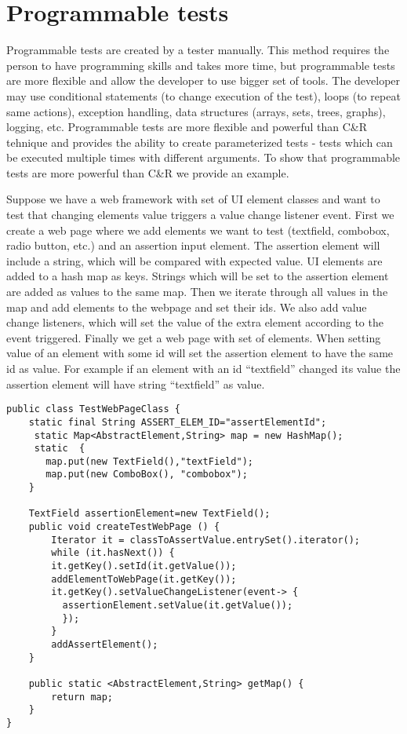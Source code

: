 		\section{Programmable tests} 
			Programmable tests are created by a tester manually. This method requires the
			person to have programming skills and takes more time, but programmable tests
			are more flexible and allow the developer to use bigger set of tools. The
			developer may use conditional statements (to change execution of the test),
			loops (to repeat same actions), exception handling, data structures (arrays,
			sets, trees, graphs), logging, etc. Programmable tests are more flexible and
			powerful than C\&R tehnique and provides the ability to create parameterized
			tests - tests which can be executed multiple times with different arguments.
			To show that programmable tests are more powerful than C\&R we provide an
			example.
			
			Suppose we have a web framework with set of UI element classes and want to
			test that changing elements value triggers a value change listener event.
			First we create a web page where we add elements we
			want to test (textfield, combobox, radio button, etc.) and an assertion input
			element. The assertion element will include a string, which will be
			compared with expected value.
			UI elements are added to a hash map as keys.
			Strings which will be set to the assertion element are added as values to the same map. Then we
			iterate through all values in the map and add elements to the webpage and set
			their ids. We also add value change listeners, which will set
			the value of the extra element according to the event triggered. Finally we
			get a web page with set of elements. When setting value of an element with
			some id will set the assertion element to have the same id as value. For
			example if an element with an id ``textfield'' changed its value the
			assertion element will have string ``textfield'' as value.
					
\begin{lstlisting}
public class TestWebPageClass {
	static final String ASSERT_ELEM_ID="assertElementId";
	 static Map<AbstractElement,String> map = new HashMap();
	 static  {
  	   map.put(new TextField(),"textField");
  	   map.put(new ComboBox(), "combobox");
	}

	TextField assertionElement=new TextField();
	public void createTestWebPage () {
	    Iterator it = classToAssertValue.entrySet().iterator();
	    while (it.hasNext()) {
	    it.getKey().setId(it.getValue());
	    addElementToWebPage(it.getKey());
	    it.getKey().setValueChangeListener(event-> {
	      assertionElement.setValue(it.getValue());
	      });
	  	}
		addAssertElement();
	}  
	
	public static <AbstractElement,String> getMap() {
		return map;
	}
}
\end{lstlisting}
      
